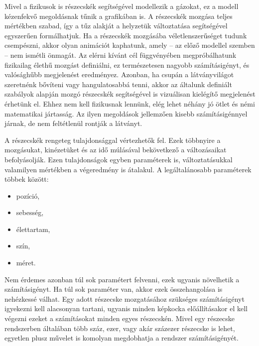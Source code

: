 Mivel a fizikusok is részecskék segítségével modellezik a gázokat, ez a modell kézenfekvő megoldásnak tűnik a grafikában is. A részecskék mozgása teljes mértékben szabad, így a tűz alakját a helyzetük változtatása segítségével egyszerűen formálhatjuk. Ha a részecskék mozgásába véletlenszerűséget tudunk csempészni, akkor olyan animációt kaphatunk, amely -- az előző modellel szemben --  nem ismétli önmagát. Az elérni kívánt cél függvényében megpróbálhatunk fizikailag élethű mozgást definiálni, ez természetesen nagyobb számításigényt, és valósághűbb megjelenést eredményez. Azonban, ha csupán a látványvilágot szeretnénk bővíteni vagy hangulatosabbá tenni, akkor az általunk definiált szabályok alapján mozgó részecskék segítségével is vizuálisan kielégítő megjelenést érhetünk el. Ehhez nem kell fizikusnak lennünk, elég lehet néhány jó ötlet és némi matematikai jártasság. Az ilyen megoldások jellemzően kisebb számításigénnyel járnak, de nem feltétlenül rontják a látványt. 

A részecskék rengeteg tulajdonsággal vértezhetők fel. Ezek többnyire a mozgásukat, kinézetüket és az idő múlásával bekövetkező a változásaikat befolyásolják. Ezen tulajdonságok egyben paraméterek is, változtatásukkal valamilyen mértékben a végeredmény is átalakul. A legáltalánosabb paraméterek többek között:
\begin{itemize}
\item pozíció, 
\item sebesség, 
\item élettartam, 
\item szín, 
\item méret. 
\end{itemize}
Nem érdemes azonban túl sok paramétert felvenni, ezek ugyanis növelhetik a számításigényt. Ha túl sok paraméter van, akkor ezek összehangolása is nehézkessé válhat. Egy adott részecske mozgatásához szükséges számításigényt igyekezni kell alacsonyan tartani, ugyanis minden képkocka előállításakor el kell végezni ezeket a számításokat minden egyes részecskén. Mivel egy részecske rendszerben általában több száz, ezer, vagy akár százezer részecske is lehet, egyetlen plusz művelet is komolyan megdobhatja a rendszer számításigényét.


